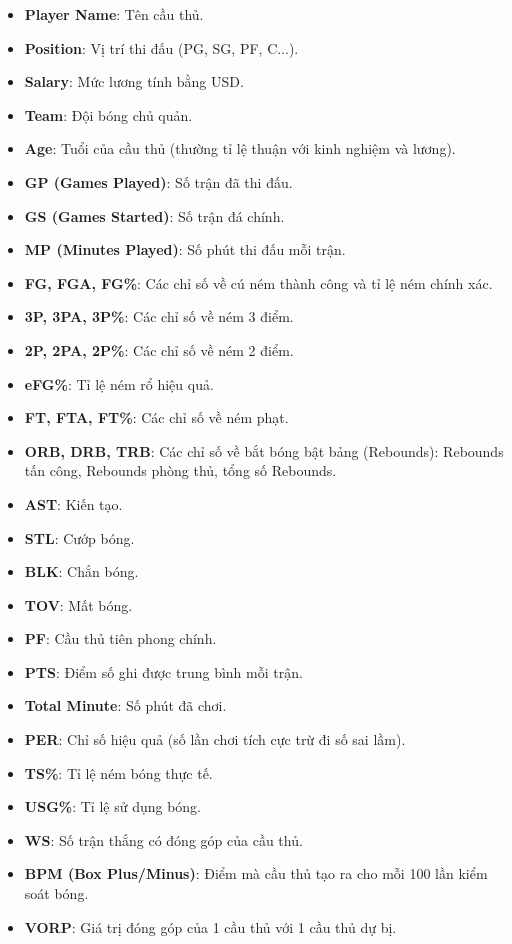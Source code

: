 \begin{itemize}
    \item \textbf{Player Name}: Tên cầu thủ.
    \item \textbf{Position}: Vị trí thi đấu (PG, SG, PF, C...).
    \item \textbf{Salary}: Mức lương tính bằng USD.
    \item \textbf{Team}: Đội bóng chủ quản.
    \item \textbf{Age}: Tuổi của cầu thủ (thường tỉ lệ thuận với kinh nghiệm và lương).
    \item \textbf{GP (Games Played)}: Số trận đã thi đấu.
    \item \textbf{GS (Games Started)}: Số trận đá chính.
    \item \textbf{MP (Minutes Played)}: Số phút thi đấu mỗi trận.
    \item \textbf{FG, FGA, FG\%}: Các chỉ số về cú ném thành công và tỉ lệ ném chính xác.
    \item \textbf{3P, 3PA, 3P\%}: Các chỉ số về ném 3 điểm.
    \item \textbf{2P, 2PA, 2P\%}: Các chỉ số về ném 2 điểm.
    \item \textbf{eFG\%}: Tỉ lệ ném rổ hiệu quả.
    \item \textbf{FT, FTA, FT\%}: Các chỉ số về ném phạt.
    \item \textbf{ORB, DRB, TRB}: Các chỉ số về bắt bóng bật bảng (Rebounds): Rebounds tấn công, Rebounds phòng thủ, tổng số Rebounds.
    \item \textbf{AST}: Kiến tạo.
    \item \textbf{STL}: Cướp bóng.
    \item \textbf{BLK}: Chắn bóng.
    \item \textbf{TOV}: Mất bóng.
    \item \textbf{PF}: Cầu thủ tiên phong chính.
    \item \textbf{PTS}: Điểm số ghi được trung bình mỗi trận.
    \item \textbf{Total Minute}: Số phút đã chơi.
    \item \textbf{PER}: Chỉ số hiệu quả (số lần chơi tích cực trừ đi số sai lầm).
    \item \textbf{TS\%}: Tỉ lệ ném bóng thực tế.
    \item \textbf{USG\%}: Tỉ lệ sử dụng bóng.
    \item \textbf{WS}: Số trận thắng có đóng góp của cầu thủ.
    \item \textbf{BPM (Box Plus/Minus)}: Điểm mà cầu thủ tạo ra cho mỗi 100 lần kiểm soát bóng.
    \item \textbf{VORP}: Giá trị đóng góp của 1 cầu thủ với 1 cầu thủ dự bị.
\end{itemize}

